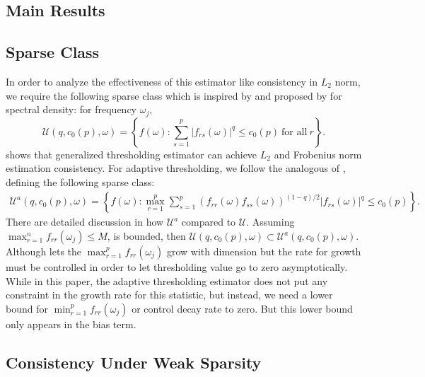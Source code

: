\subsection{Main Results}
\subsection{Sparse Class}
In order to analyze the effectiveness of this estimator like consistency in $L_2$ norm, we require the following sparse class which is inspired by \cite{bickel2008covariance} and proposed by \cite{sun2018large} for spectral density: for frequency $\omega_j$, 
\begin{equation}
\mathcal{U}(q, c_0(p), \omega) = \left\{f(\omega): \sum_{s=1}^p |f_{rs}(\omega)|^q \le c_0(p) ~\text{for all}~ r\right \}. 
\end{equation}
\cite{sun2018large} shows that generalized thresholding estimator can achieve $L_2$ and Frobenius norm estimation consistency. For adaptive thresholding, we follow the analogous of \cite{cai2011adaptive}, defining the following sparse class:
\begin{equation}
\begin{aligned}
\label{eq:sparse_class}
\mathcal{U}^a(q, c_0(p), \omega) = \left\{f(\omega): \max_{r=1}^p\sum_{s=1}^p (f_{rr}(\omega)f_{ss}(\omega))^{(1-q)/2} |f_{rs}(\omega)|^q \le c_0(p)\right \}.  
\end{aligned}
\end{equation}
There are detailed discussion in \cite{cai2011adaptive}
how $\mathcal{U}^a$ compared to $\mathcal{U}$. Assuming $\max_{r=1}^n f_{rr}(\omega_j)\le M$, is bounded, then
$\mathcal{U}(q, c_0(p), \omega) \subset \mathcal{U}^a(q, c_0(p), \omega) $. Although \cite{sun2018large} lets the $\max_{r=1}^p f_{rr}(\omega_j)$ grow with dimension but the rate for growth must be controlled in order to let thresholding value go to zero asymptotically. While in this paper,  the adaptive thresholding estimator does not put any constraint in the growth rate for this statistic, but instead, we need a lower bound for $\min_{r=1}^p f_{rr}(\omega_j)$ or control decay rate to zero. But this lower bound only appears in the bias term. 

\subsection{Consistency Under Weak Sparsity}

